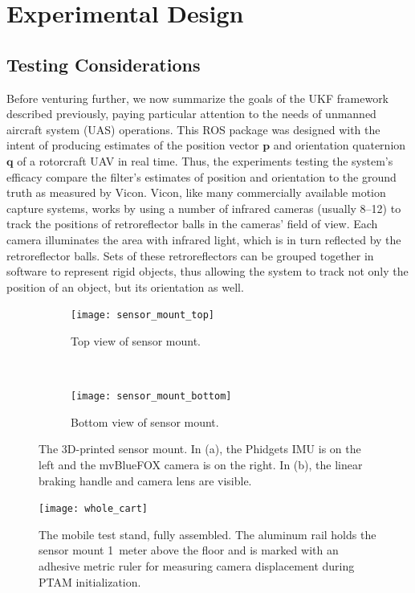 \chapter{Experimental Design} \label{ch:Exp_Design}

\section{Testing Considerations}

Before venturing further, we now summarize the goals of the UKF framework described previously, paying particular attention to the needs of unmanned aircraft system (UAS) operations. This ROS package was designed with the intent of producing estimates of the position vector $\mathbf{p}$ and orientation quaternion $\mathbf{q}$ of a rotorcraft UAV in real time. Thus, the experiments testing the system's efficacy compare the filter's estimates of position and orientation to the ground truth as measured by Vicon. Vicon, like many commercially available motion capture systems, works by using a number of infrared cameras (usually 8--12) to track the positions of retroreflector balls in the cameras' field of view. Each camera illuminates the area with infrared light, which is in turn reflected by the retroreflector balls. Sets of these retroreflectors can be grouped together in software to represent rigid objects, thus allowing the system to track not only the position of an object, but its orientation as well.

\begin{figure}[t]
    \centering
    \begin{subfigure}[t]{0.5\textwidth}
        \centering
        \texttt{[image: sensor\_mount\_top]}
        \caption{Top view of sensor mount.}
    \end{subfigure}%
    ~ 
    \begin{subfigure}[t]{0.5\textwidth}
        \centering
        \texttt{[image: sensor\_mount\_bottom]}
        \caption{Bottom view of sensor mount.}
    \end{subfigure}
    \caption[3D-printed Sensor Mount]{The 3D-printed sensor mount. In (a), the Phidgets IMU is on the left and the mvBlueFOX camera is on the right. In (b), the linear braking handle and camera lens are visible.}
    \label{fig:sensor_mount}
\end{figure}

\begin{figure}
  \centering
    \texttt{[image: whole\_cart]}
  \caption[Mobile Test Stand]{The mobile test stand, fully assembled. The aluminum rail holds the sensor mount 1~meter above the floor and is marked with an adhesive metric ruler for measuring camera displacement during PTAM initialization.}
  \label{fig:whole_cart}
\end{figure}

